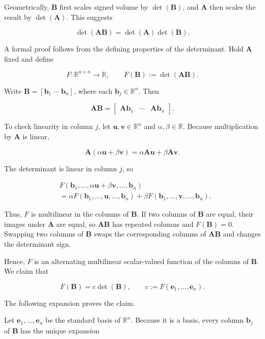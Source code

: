 \documentclass[
  australian,
  12pt,
  letterpaper,
  DIV=11,
  numbers=noendperiod,
  twoside]{scrreprt}
\begin{document}
Geometrically, \(\mathbf B\) first scales signed volume by
\(\det(\mathbf B)\), and \(\mathbf A\) then scales the result by
\(\det(\mathbf A)\). This suggests

\[
\det(\mathbf A\mathbf B)=\det(\mathbf A)\det(\mathbf B).
\]

A formal proof follows from the defining properties of the determinant.
Hold \(\mathbf A\) fixed and define

\[
F:\mathbb R^{n\times n}\rightarrow\mathbb R,
\qquad
F(\mathbf B)\mathrel{:=}\det(\mathbf A\mathbf B).
\]

Write \(\mathbf B=[\mathbf b_1\;\cdots\;\mathbf b_n]\), where each
\(\mathbf b_j\in\mathbb R^n\). Then

\[
\mathbf A\mathbf B
=
\begin{bmatrix}
\mathbf A\mathbf b_1&\cdots&\mathbf A\mathbf b_n
\end{bmatrix}.
\]

To check linearity in column \(j\), let
\(\mathbf u,\mathbf v\in\mathbb R^n\) and \(\alpha,\beta\in\mathbb R\).
Because multiplication by \(\mathbf A\) is linear,

\[
\mathbf A(\alpha\mathbf u+\beta\mathbf v)
=
\alpha\mathbf A\mathbf u+\beta\mathbf A\mathbf v.
\]

The determinant is linear in column \(j\), so

\[
\begin{aligned}
&F(\mathbf b_1,\ldots,\alpha\mathbf u+\beta\mathbf v,\ldots,\mathbf b_n)\\
&=\alpha F(\mathbf b_1,\ldots,\mathbf u,\ldots,\mathbf b_n)
+\beta F(\mathbf b_1,\ldots,\mathbf v,\ldots,\mathbf b_n).
\end{aligned}
\]

Thus, \(F\) is multilinear in the columns of \(\mathbf B\). If two
columns of \(\mathbf B\) are equal, their images under \(\mathbf A\) are
equal, so \(\mathbf A\mathbf B\) has repeated columns and
\(F(\mathbf B)=0\). Swapping two columns of \(\mathbf B\) swaps the
corresponding columns of \(\mathbf A\mathbf B\) and changes the
determinant sign.

Hence, \(F\) is an alternating multilinear scalar-valued function of the
columns of \(\mathbf B\). We claim that

\[
F(\mathbf B)=c\det(\mathbf B),
\qquad
c\mathrel{:=}F(\mathbf e_1,\ldots,\mathbf e_n).
\]

The following expansion proves the claim.

Let \(\mathbf e_1,\ldots,\mathbf e_n\) be the standard basis of
\(\mathbb R^n\). Because it is a basis, every column \(\mathbf b_j\) of
\(\mathbf B\) has the unique expansion
\end{document}
